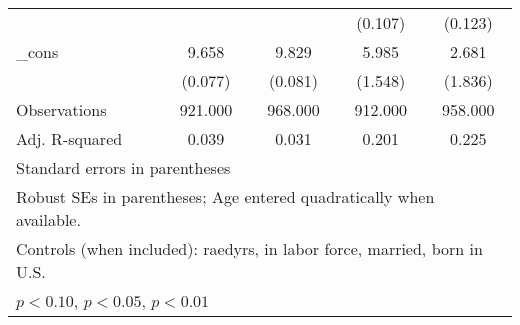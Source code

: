 \begin{table}[htbp]
\begin{tabular}{l*{4}{c}}
          &                  &                  &  (0.107)         &  (0.123)         \\
\_cons    &    9.658\sym{***}&    9.829\sym{***}&    5.985\sym{***}&    2.681         \\
          &  (0.077)         &  (0.081)         &  (1.548)         &  (1.836)         \\
\midrule
Observations&  921.000         &  968.000         &  912.000         &  958.000         \\
Adj. R-squared&    0.039         &    0.031         &    0.201         &    0.225         \\
\bottomrule
\multicolumn{5}{l}{\footnotesize Standard errors in parentheses}\\
\multicolumn{5}{l}{\footnotesize Robust SEs in parentheses; Age entered quadratically when available.}\\
\multicolumn{5}{l}{\footnotesize Controls (when included): raedyrs, in labor force, married, born in U.S.}\\
\multicolumn{5}{l}{\footnotesize \sym{*} \(p<0.10\), \sym{**} \(p<0.05\), \sym{***} \(p<0.01\)}\\
\end{tabular}
\end{table}
